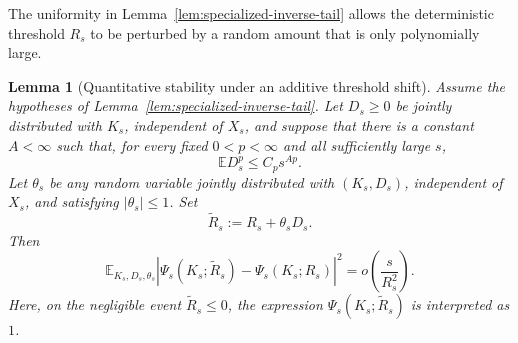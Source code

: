 \documentclass[11pt]{article}
\newtheorem{lemma}{Lemma}
\newcommand{\Ebb}{\mathbb E}
\newcommand{\1}{\mathbf 1}
\begin{document}
The uniformity in Lemma~\ref{lem:specialized-inverse-tail} allows the deterministic
threshold \(R_s\) to be perturbed by a random amount that is only polynomially large.

\begin{lemma}[Quantitative stability under an additive threshold shift]
\label{lem:inverse-tail-threshold-shift}
Assume the hypotheses of Lemma~\ref{lem:specialized-inverse-tail}.  Let \(D_s\ge0\) be
jointly distributed with \(K_s\), independent of \(X_s\), and suppose that there is a
constant \(A<\infty\) such that, for every fixed \(0<p<\infty\) and all sufficiently large \(s\),
\begin{equation}
        \Ebb D_s^p\le C_p s^{Ap}.
        \label{eq:threshold-shift-moments}
\end{equation}
Let \(\theta_s\) be any random variable jointly distributed with \((K_s,D_s)\), independent
of \(X_s\), and satisfying \(|\theta_s|\le1\).  Set
\[
        \widetilde R_s
        :=
        R_s+\theta_sD_s.
\]
Then
\begin{equation}
        \Ebb_{K_s,D_s,\theta_s}
        \left|
        \Psi_s(K_s;\widetilde R_s)
        -
        \Psi_s(K_s;R_s)
        \right|^2
        =
        o\left(\frac{s}{R_s^2}\right).
        \label{eq:quantitative-threshold-shift}
\end{equation}
Here, on the negligible event \(\widetilde R_s\le0\), the expression
\(\Psi_s(K_s;\widetilde R_s)\) is interpreted as \(1\).
\end{lemma}
\end{document}
